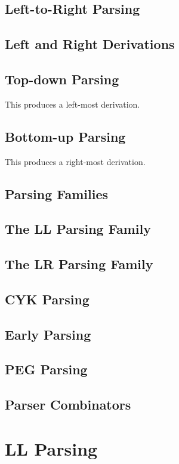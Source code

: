 \documentclass{book}
\begin{document}
\section{Left-to-Right Parsing}

\section{Left and Right Derivations}

\section{Top-down Parsing}
This produces a left-most derivation.

\section{Bottom-up Parsing}
This produces a right-most derivation.


\section{Parsing Families}

\section{The LL Parsing Family}
\section{The LR Parsing Family}
\section{CYK Parsing}
\section{Early Parsing}
\section{PEG Parsing}
\section{Parser Combinators}


%
%
\chapter{LL Parsing}
\end{document}
